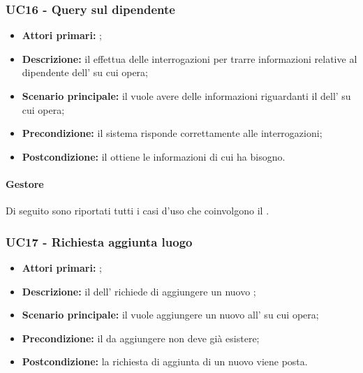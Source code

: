 \documentclass[casi-duso]{subfiles}
\begin{document}
\subsubsection{UC16 - Query sul dipendente}
\label{subsub:UC16}

\begin{itemize}
  \item \textbf{Attori primari:} ;
  \item \textbf{Descrizione:} il  effettua delle interrogazioni per trarre informazioni relative al dipendente dell' su cui opera;
  \item \textbf{Scenario principale:} il  vuole avere delle informazioni riguardanti il dell' su cui opera;
  \item \textbf{Precondizione:} il sistema risponde correttamente alle interrogazioni;
  \item \textbf{Postcondizione:} il  ottiene le informazioni di cui ha bisogno.

\end{itemize}

\paragraph{Gestore}
Di seguito sono riportati tutti i casi d'uso che coinvolgono il  .

\subsubsection{UC17 - Richiesta aggiunta luogo}
\label{subsub:UC17}

\begin{itemize}
  \item \textbf{Attori primari:} ;
  \item \textbf{Descrizione:} il  dell' richiede di aggiungere un nuovo ;
  \item \textbf{Scenario principale:} il  vuole aggiungere un nuovo  all' su cui opera;
  \item \textbf{Precondizione:} il  da aggiungere non deve già esistere;
  \item \textbf{Postcondizione:} la richiesta di aggiunta di un nuovo  viene posta.

\end{itemize}
\end{document}
